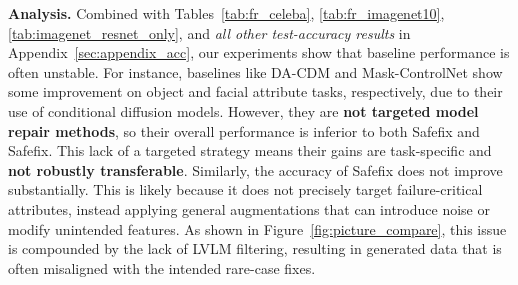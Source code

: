 \documentclass[10pt]{article} %
\newcommand{\model}{Safefix\xspace}
\newcommand{\hibug}{Safefix\xspace}
\begin{document}
\begin{table}
\vspace{-10pt}
\centering
\small
\setlength{\tabcolsep}{4pt}
\renewcommand{\arraystretch}{0.95}
\caption{Test accuracy (\%) on ImageNet10 using ResNet-18.}
\label{tab:imagenet_resnet_only}

\vspace{-10pt}
\end{table}


\noindent\textbf{Analysis.}
Combined with Tables~\ref{tab:fr_celeba}, \ref{tab:fr_imagenet10}, \ref{tab:imagenet_resnet_only}, and \emph{all other test-accuracy results} in Appendix~\ref{sec:appendix_acc}, our experiments show that baseline performance is often unstable. For instance, baselines like DA-CDM and Mask-ControlNet show some improvement on object and facial attribute tasks, respectively, due to their use of conditional diffusion models. However, they are \textbf{not targeted model repair methods}, so their overall performance is inferior to both Safefix and \model. This lack of a targeted strategy means their gains are task-specific and \textbf{not robustly transferable}.
Similarly, the accuracy of \hibug{} does not improve substantially. This is likely because it does not precisely target failure-critical attributes, instead applying general augmentations that can introduce noise or modify unintended features. As shown in Figure~\ref{fig:picture_compare}, this issue is compounded by the lack of LVLM filtering, resulting in generated data that is often misaligned with the intended rare-case fixes.
\end{document}
